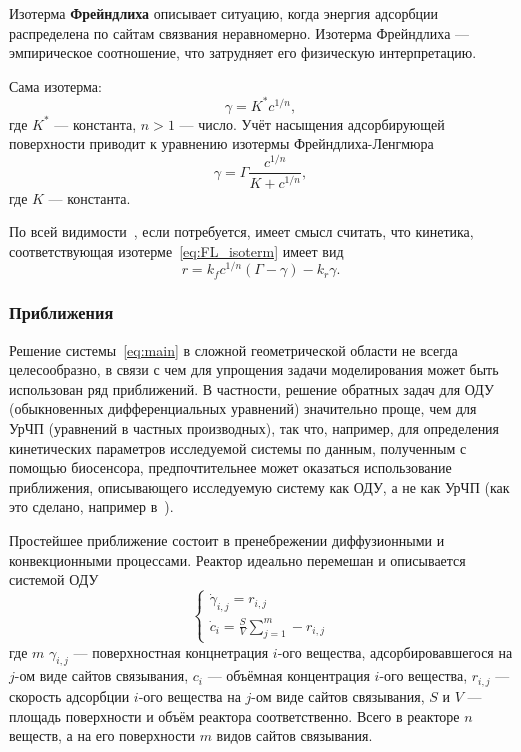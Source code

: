 \documentclass[oneside,final,12pt]{extreport}
\begin{document}
Изотерма \textbf{Фрейндлиха} описывает ситуацию,
когда энергия адсорбции распределена по сайтам связвания неравномерно.
Изотерма Фрейндлиха --- эмпирическое соотношение,
что затрудняет его физическую интерпретацию.

Сама изотерма:
\begin{equation}
  \gamma = K^*c^{1/n},
\label{eq:pure_Freundlich_isoterm}
\end{equation}
где $K^*$ --- константа, $n>1$ --- число.
Учёт насыщения адсорбирующей поверхности приводит к
уравнению изотермы Фрейндлиха-Ленгмюра
\begin{equation}
  \gamma = \Gamma\frac{c^{1/n}}{K + c^{1/n}},
\label{eq:FL_isoterm}
\end{equation}
где $K$ --- константа.

По всей видимости~\cite{bib:freundlich_kinetics},
если потребуется, имеет смысл считать, что
кинетика, соответствующая изотерме~\eqref{eq:FL_isoterm} имеет вид
\begin{equation}
  r = k_f c^{1/n} (\Gamma - \gamma) - k_r \gamma.
\label{eq:FL_kinetics}
\end{equation}



\subsubsection*{Приближения}
Решение системы~\eqref{eq:main} в сложной геометрической области
не всегда целесообразно,
в связи с чем для упрощения задачи моделирования
может быть использован ряд приближений.
В частности, решение обратных задач для ОДУ
(обыкновенных дифференциальных уравнений) значительно проще, чем для УрЧП
(уравнений в частных производных),
так что, например, для определения кинетических параметров исследуемой системы
по данным, полученным с помощью биосенсора, предпочтительнее
может оказаться использование
приближения, описывающего исследуемую систему как ОДУ, а не как УрЧП
(как это сделано, например в~\cite{bib:FULLTEXT_inverse_example}).

Простейшее приближение состоит в пренебрежении диффузионными и конвекционными
процессами. Реактор идеально перемешан и описывается системой ОДУ
\begin{equation}
\begin{cases}
  \dot{\gamma}_{i,j} = r_{i,j}\\
  \dot{c}_i = \frac{S}{V}\sum\limits_{j=1}^{m}-r_{i,j}
\label{eq:perfectly_mixed_ode}
\end{cases}
\end{equation}
где $m$
$\gamma_{i,j}$ --- поверхностная концнетрация $i$-ого вещества,
адсорбировавшегося на $j$-ом виде сайтов связывания,
$c_i$ --- объёмная концентрация $i$-ого вещества,
$r_{i,j}$ --- скорость адсорбции $i$-ого вещества на $j$-ом виде сайтов связывания,
$S$ и $V$ --- площадь поверхности и объём реактора соответственно.
Всего в реакторе $n$ веществ, а на его поверхности $m$ видов сайтов связывания.
\end{document}
